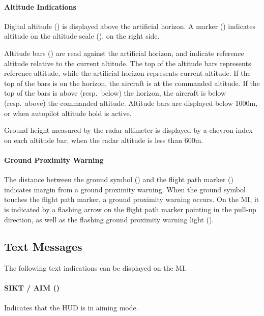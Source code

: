 \paragraph{Altitude Indications}
Digital altitude () is displayed above the artificial horizon.
A marker () indicates altitude
on the altitude scale (), on the right side.

Altitude bars () are read against the artificial horizon,
and indicate reference altitude relative to the current altitude.
The top of the altitude bars represents reference altitude,
while the artificial horizon represents current altitude.
If the top of the bars is on the horizon, the aircraft is at the commanded altitude.
If the top of the bars is above (resp.\ below) the horizon,
the aircraft is below (resp.\ above) the commanded altitude.
Altitude bars are displayed below 1000m, or when autopilot altitude hold is active.

Ground height measured by the radar altimeter is displayed by a chevron index on each altitude bar,
when the radar altitude is less than 600m.

\paragraph{Ground Proximity Warning}
The distance between the ground symbol ()
and the flight path marker ()
indicates margin from a ground proximity warning.
When the ground symbol touches the flight path marker, a ground proximity warning occurs.
On the MI, it is indicated by a flashing arrow on the flight path marker pointing in the pull-up direction,
as well as the flashing ground proximity warning light ().

\subsection{Text Messages}
The following text indications can be displayed on the MI.

\paragraph{SIKT / AIM ()}
Indicates that the HUD is in aiming mode.


